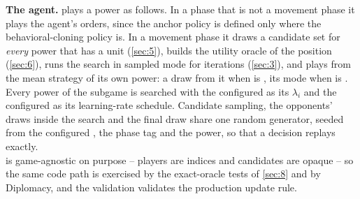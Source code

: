 \documentclass[12pt,a4paper]{article}
\begin{document}
\textbf{The agent.}
 plays a power as follows.
In a phase that is not a movement phase it plays the  agent's orders, since the anchor policy is defined only where the behavioral-cloning policy is.
In a movement phase it draws a candidate set for \emph{every} power that has a unit (\cref{sec:5}), builds the utility oracle of the position (\cref{sec:6}), runs the search in sampled mode for  iterations (\cref{sec:3}), and plays from the mean strategy of its own power: a draw from it when  is , its mode when  is .
Every power of the subgame is searched with the configured  as its $\lambda_i$ and the configured  as its learning-rate schedule.
Candidate sampling, the opponents' draws inside the search and the final draw share one random generator, seeded from the configured , the phase tag and the power, so that a decision replays exactly.\\
 is game-agnostic on purpose -- players are indices and candidates are opaque -- so the same code path is exercised by the exact-oracle tests of \cref{sec:8} and by Diplomacy, and the validation validates the production update rule.
\end{document}
